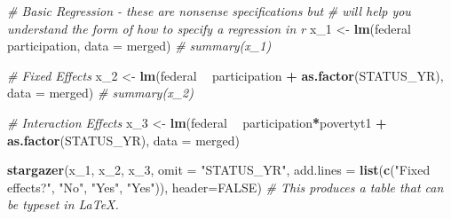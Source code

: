 \documentclass[
]{article}
\newenvironment{Shaded}{\begin{snugshade}}{\end{snugshade}}
\newcommand{\CommentTok}[1]{\textcolor[rgb]{0.56,0.35,0.01}{\textit{#1}}}
\newcommand{\DataTypeTok}[1]{\textcolor[rgb]{0.13,0.29,0.53}{#1}}
\newcommand{\DecValTok}[1]{\textcolor[rgb]{0.00,0.00,0.81}{#1}}
\newcommand{\KeywordTok}[1]{\textcolor[rgb]{0.13,0.29,0.53}{\textbf{#1}}}
\newcommand{\NormalTok}[1]{#1}
\newcommand{\OperatorTok}[1]{\textcolor[rgb]{0.81,0.36,0.00}{\textbf{#1}}}
\newcommand{\OtherTok}[1]{\textcolor[rgb]{0.56,0.35,0.01}{#1}}
\newcommand{\StringTok}[1]{\textcolor[rgb]{0.31,0.60,0.02}{#1}}
\begin{document}
\begin{Shaded}
\begin{Highlighting}[]
\CommentTok{# Basic Regression - these are nonsense specifications but }
\CommentTok{# will help you understand the form of how to specify a regression in r }
\NormalTok{x_}\DecValTok{1}\NormalTok{ <-}\StringTok{ }\KeywordTok{lm}\NormalTok{(federal }\OperatorTok{~}\StringTok{ }\NormalTok{participation, }\DataTypeTok{data =}\NormalTok{ merged)  }
\CommentTok{# summary(x_1)}

\CommentTok{# Fixed Effects }
\NormalTok{x_}\DecValTok{2}\NormalTok{ <-}\StringTok{ }\KeywordTok{lm}\NormalTok{(federal }\OperatorTok{~}\StringTok{ }\NormalTok{participation }\OperatorTok{+}\StringTok{ }\KeywordTok{as.factor}\NormalTok{(STATUS_YR), }\DataTypeTok{data =}\NormalTok{ merged)}
\CommentTok{# summary(x_2)}

\CommentTok{# Interaction Effects }
\NormalTok{x_}\DecValTok{3}\NormalTok{ <-}\StringTok{ }\KeywordTok{lm}\NormalTok{(federal }\OperatorTok{~}\StringTok{ }\NormalTok{participation}\OperatorTok{*}\NormalTok{povertyt1 }\OperatorTok{+}\StringTok{ }\KeywordTok{as.factor}\NormalTok{(STATUS_YR), }\DataTypeTok{data =}\NormalTok{ merged)}


\KeywordTok{stargazer}\NormalTok{(x_}\DecValTok{1}\NormalTok{, x_}\DecValTok{2}\NormalTok{, x_}\DecValTok{3}\NormalTok{, }\DataTypeTok{omit =} \StringTok{"STATUS_YR"}\NormalTok{, }
          \DataTypeTok{add.lines =} \KeywordTok{list}\NormalTok{(}\KeywordTok{c}\NormalTok{(}\StringTok{"Fixed effects?"}\NormalTok{, }\StringTok{"No"}\NormalTok{, }\StringTok{"Yes"}\NormalTok{, }\StringTok{"Yes"}\NormalTok{)),}
          \DataTypeTok{header=}\OtherTok{FALSE}\NormalTok{) }\CommentTok{# This produces a table that can be typeset in LaTeX. }
\end{Highlighting}
\end{Shaded}
\end{document}
